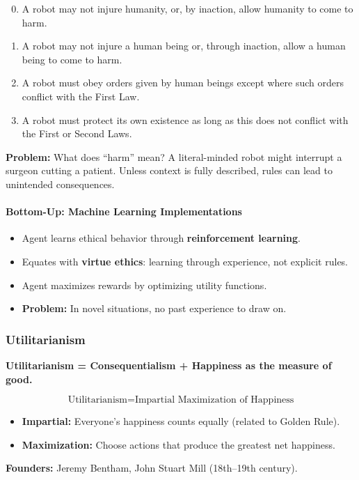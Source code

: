 \begin{exbox}
\begin{enumerate}
  \setcounter{enumi}{-1}
  \item A robot may not injure humanity, or, by inaction, allow humanity to come to harm.
  \item A robot may not injure a human being or, through inaction, allow a human being to come to harm.
  \item A robot must obey orders given by human beings except where such orders conflict with the First Law.
  \item A robot must protect its own existence as long as this does not conflict with the First or Second Laws.
\end{enumerate}

\textbf{Problem:} What does ``harm'' mean? A literal-minded robot might interrupt a surgeon cutting a patient. Unless context is fully described, rules can lead to unintended consequences.
\end{exbox}

\separator

\paragraph*{Bottom-Up: Machine Learning Implementations}

\begin{itemize}
  \item Agent learns ethical behavior through \textbf{reinforcement learning}.
  \item Equates with \textbf{virtue ethics}: learning through experience, not explicit rules.
  \item Agent maximizes rewards by optimizing utility functions.
  \item \textbf{Problem:} In novel situations, no past experience to draw on.
\end{itemize}

\bigseparator

\subsubsection{Utilitarianism}

\begin{defbox}[Utilitarianism]
\textbf{Utilitarianism = Consequentialism + Happiness as the measure of good.}

\[
\text{Utilitarianism} = \text{Impartial Maximization of Happiness}
\]

\begin{itemize}
  \item \textbf{Impartial:} Everyone's happiness counts equally (related to Golden Rule).
  \item \textbf{Maximization:} Choose actions that produce the greatest net happiness.
\end{itemize}

\textbf{Founders:} Jeremy Bentham, John Stuart Mill (18th--19th century).
\end{defbox}


